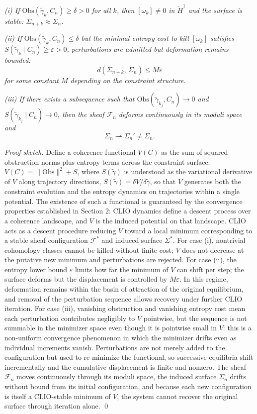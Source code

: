 \documentclass[12pt, a4paper]{article}
\begin{document}
\textit{(i) If $\mathrm{Obs}(\tilde{\gamma}_k, C_n) \geq \delta > 0$ for all $k$, then $[\omega_k] \neq 0$ in $\check{H}^1$ and the surface is stable: $\Sigma_{n+k} \approx \Sigma_n$.}

\textit{(ii) If $\mathrm{Obs}(\tilde{\gamma}_k, C_n) \leq \delta$ but the minimal entropy cost to kill $[\omega_k]$ satisfies $S(\tilde{\gamma}_k \mid C_n) \geq \varepsilon > 0$, perturbations are admitted but deformation remains bounded:}
\[
d(\Sigma_{n+k},\, \Sigma_n) \leq M\varepsilon
\]
\textit{for some constant $M$ depending on the constraint structure.}

\textit{(iii) If there exists a subsequence such that $\mathrm{Obs}(\tilde{\gamma}_{k_j}, C_n) \to 0$ and $S(\tilde{\gamma}_{k_j} \mid C_n) \to 0$, then the sheaf $\mathcal{F}_n$ deforms continuously in its moduli space and}
\[
\Sigma_n \rightharpoonup \Sigma_n' \neq \Sigma_n.
\]

\textit{Proof sketch.} Define a coherence functional $V(C)$ as the sum of squared obstruction norms plus entropy terms across the constraint surface: $V(C) = \|\mathrm{Obs}\|^2 + S$, where $S(\tilde{\gamma})$ is understood as the variational derivative of $V$ along trajectory directions, $S(\tilde{\gamma}) = \delta V/\delta\tilde{\gamma}$, so that $V$ generates both the constraint evolution and the entropy dynamics on trajectories within a single potential. The existence of such a functional is guaranteed by the convergence properties established in Section 2: CLIO dynamics define a descent process over a coherence landscape, and $V$ is the induced potential on that landscape. CLIO acts as a descent procedure reducing $V$ toward a local minimum corresponding to a stable sheaf configuration $\mathcal{F}^*$ and induced surface $\Sigma^*$. For case (i), nontrivial cohomology classes cannot be killed without finite cost; $V$ does not decrease at the putative new minimum and perturbations are rejected. For case (ii), the entropy lower bound $\varepsilon$ limits how far the minimum of $V$ can shift per step; the surface deforms but the displacement is controlled by $M\varepsilon$. In this regime, deformation remains within the basin of attraction of the original equilibrium, and removal of the perturbation sequence allows recovery under further CLIO iteration. For case (iii), vanishing obstruction and vanishing entropy cost mean each perturbation contributes negligibly to $V$ pointwise, but the sequence is not summable in the minimizer space even though it is pointwise small in $V$: this is a non-uniform convergence phenomenon in which the minimizer drifts even as individual increments vanish. Perturbations are not merely added to the configuration but used to re-minimize the functional, so successive equilibria shift incrementally and the cumulative displacement is finite and nonzero. The sheaf $\mathcal{F}_n$ moves continuously through its moduli space, the induced surface $\Sigma_n$ drifts without bound from its initial configuration, and because each new configuration is itself a CLIO-stable minimum of $V$, the system cannot recover the original surface through iteration alone. \qed
\end{document}
